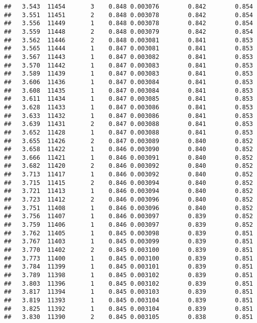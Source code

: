 \documentclass[
]{book}
\begin{document}
\begin{verbatim}
##   3.543  11454       3    0.848 0.003076        0.842        0.854
##   3.551  11451       2    0.848 0.003078        0.842        0.854
##   3.556  11449       1    0.848 0.003078        0.842        0.854
##   3.559  11448       2    0.848 0.003079        0.842        0.854
##   3.562  11446       2    0.848 0.003081        0.841        0.853
##   3.565  11444       1    0.847 0.003081        0.841        0.853
##   3.567  11443       1    0.847 0.003082        0.841        0.853
##   3.570  11442       1    0.847 0.003083        0.841        0.853
##   3.589  11439       1    0.847 0.003083        0.841        0.853
##   3.606  11436       1    0.847 0.003084        0.841        0.853
##   3.608  11435       1    0.847 0.003084        0.841        0.853
##   3.611  11434       1    0.847 0.003085        0.841        0.853
##   3.628  11433       1    0.847 0.003086        0.841        0.853
##   3.633  11432       1    0.847 0.003086        0.841        0.853
##   3.639  11431       2    0.847 0.003088        0.841        0.853
##   3.652  11428       1    0.847 0.003088        0.841        0.853
##   3.655  11426       2    0.847 0.003089        0.840        0.852
##   3.658  11422       1    0.846 0.003090        0.840        0.852
##   3.666  11421       1    0.846 0.003091        0.840        0.852
##   3.682  11420       2    0.846 0.003092        0.840        0.852
##   3.713  11417       1    0.846 0.003092        0.840        0.852
##   3.715  11415       2    0.846 0.003094        0.840        0.852
##   3.721  11413       1    0.846 0.003094        0.840        0.852
##   3.723  11412       2    0.846 0.003096        0.840        0.852
##   3.751  11408       1    0.846 0.003096        0.840        0.852
##   3.756  11407       1    0.846 0.003097        0.839        0.852
##   3.759  11406       1    0.846 0.003097        0.839        0.852
##   3.762  11405       1    0.845 0.003098        0.839        0.851
##   3.767  11403       1    0.845 0.003099        0.839        0.851
##   3.770  11402       2    0.845 0.003100        0.839        0.851
##   3.773  11400       1    0.845 0.003100        0.839        0.851
##   3.784  11399       1    0.845 0.003101        0.839        0.851
##   3.789  11398       1    0.845 0.003102        0.839        0.851
##   3.803  11396       1    0.845 0.003102        0.839        0.851
##   3.817  11394       1    0.845 0.003103        0.839        0.851
##   3.819  11393       1    0.845 0.003104        0.839        0.851
##   3.825  11392       1    0.845 0.003104        0.839        0.851
##   3.830  11390       2    0.845 0.003105        0.838        0.851

\end{verbatim}
\end{document}
